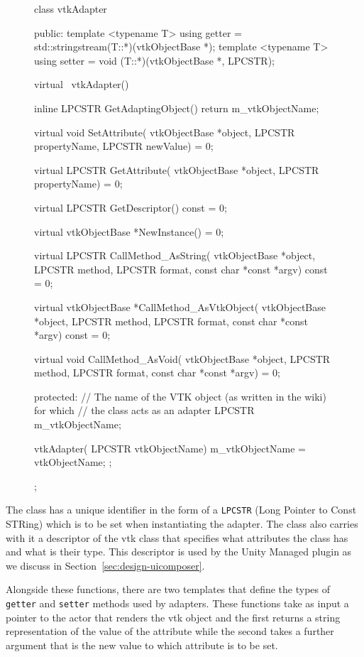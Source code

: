 \begin{figure}[ht!]
    \centering
    \begin{cpp}[label=lst:vtkadapter,caption={vtkAdapter class}]
class vtkAdapter
{
public:
    template <typename T> using getter = std::stringstream(T::*)(vtkObjectBase *);
    template <typename T> using setter = void (T::*)(vtkObjectBase *, LPCSTR);

    virtual ~vtkAdapter() { }

    inline LPCSTR GetAdaptingObject() 
    {
        return m_vtkObjectName;
    }

    virtual void SetAttribute(
        vtkObjectBase *object,
        LPCSTR propertyName,
        LPCSTR newValue) = 0;

    virtual LPCSTR GetAttribute(
        vtkObjectBase *object,
        LPCSTR propertyName) = 0;

    virtual LPCSTR GetDescriptor() const = 0;

    virtual vtkObjectBase *NewInstance() = 0;

    virtual LPCSTR CallMethod_AsString(
        vtkObjectBase *object,
        LPCSTR method,
        LPCSTR format,
        const char *const *argv) const = 0;

    virtual vtkObjectBase *CallMethod_AsVtkObject(
        vtkObjectBase *object,
        LPCSTR method,
        LPCSTR format,
        const char *const *argv) const = 0;

    virtual void CallMethod_AsVoid(
        vtkObjectBase *object,
        LPCSTR method,
        LPCSTR format,
        const char *const *argv) = 0;

protected:
    // The name of the VTK object (as written in the wiki) for which
    // the class acts as an adapter
    LPCSTR m_vtkObjectName;

    vtkAdapter(
        LPCSTR vtkObjectName) 
    { 
        m_vtkObjectName = vtkObjectName;
    };
};
    \end{cpp}
\end{figure}

The class has a unique identifier in the form of a \verb|LPCSTR| (Long Pointer to Const STRing) which is to be set when instantiating the adapter. The class also carries with it a descriptor of the \acrshort{vtk} class that specifies what attributes the class has and what is their type. This descriptor is used by the Unity Managed plugin as we discuss in Section~\ref{sec:design-uicomposer}.

Alongside these functions, there are two templates that define the types of \verb|getter| and \verb|setter| methods used by adapters. These functions take as input a pointer to the actor that renders the \acrshort{vtk} object and the first returns a string representation of the value of the attribute while the second takes a further argument that is the new value to which attribute is to be set.

